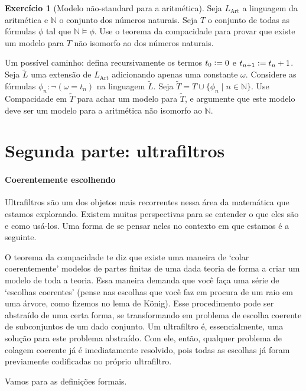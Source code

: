 \documentclass[11pt]{article}
\newcommand{\defeq}{\vcentcolon=}
\newcommand{\luadificil}{
\emoji{waxing-gibbous-moon}
}
\theoremstyle{definition}
\theoremstyle{definition}
\theoremstyle{definition}
\theoremstyle{definition}
\theoremstyle{definition}
\theoremstyle{definition}
\theoremstyle{definition}
\theoremstyle{definition}
\theoremstyle{definition}
\theoremstyle{definition}
\theoremstyle{definition}
\theoremstyle{definition}
\theoremstyle{definition}
\newtheorem{exersisio}{Exercício}
\newenvironment{exercicio}{
\definecolor{shadecolor}{HTML}{CFB5FF}
\begin{shaded}
\begin{exersisio}
}
{
\end{exersisio}
\end{shaded}
}
\begin{document}
\begin{exercicio}[Modelo não-standard para a aritmética]
  \luadificil Seja $L_{\text{Art}}$ a linguagem da aritmética e $\mathbb{N}$ o conjunto dos números naturais. Seja $T$ o conjunto de todas as fórmulas $\phi$ tal que $\mathbb{N} \vDash \phi$. Use o teorema da compacidade para provar que existe um modelo para $T$ não isomorfo ao dos números naturais.

  Um possível caminho: defina recursivamente os termos $t_0 \defeq 0$ e $t_{n+1} \defeq t_n + 1$. Seja $\tilde{L}$ uma extensão de $L_{\text{Art}}$ adicionando apenas uma constante $\omega$. Considere as fórmulas $\phi_n : \lnot (\omega = t_n)$ na linguagem $\tilde{L}$. Seja $\tilde{T} = T \cup \{\phi_n \mid n \in \mathbb{N}\}$. Use Compacidade em $\tilde{T}$ para achar um modelo para $\tilde{T}$, e argumente que este modelo deve ser um modelo para a aritmética não isomorfo ao $\mathbb{N}$.
\end{exercicio}

\section{Segunda parte: ultrafiltros}

\paragraph{Coerentemente escolhendo} Ultrafiltros são um dos objetos mais recorrentes nessa área da matemática que estamos explorando. Existem muitas perspectivas para se entender o que eles são e como usá-los. Uma forma de se pensar neles no contexto em que estamos é a seguinte.

O teorema da compacidade te diz que existe uma maneira de `colar coerentemente' modelos de partes finitas de uma dada teoria de forma a criar um modelo de toda a teoria. Essa maneira demanda que você faça uma série de `escolhas coerentes' (pense nas escolhas que você faz em procura de um raio em uma árvore, como fizemos no lema de König). Esse procedimento pode ser abstraído de uma certa forma, se transformando em problema de escolha coerente de subconjuntos de um dado conjunto. Um ultrafiltro é, essencialmente, uma solução para este problema abstraído. Com ele, então, qualquer problema de colagem coerente já é imediatamente resolvido, pois todas as escolhas já foram previamente codificadas no próprio ultrafiltro.

Vamos para as definições formais.
\end{document}
